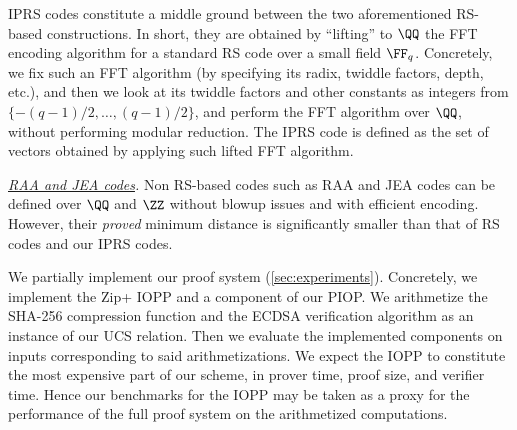 IPRS codes constitute a middle ground between the two aforementioned RS-based constructions. In short, they are obtained by ``lifting'' to $\QQ$ the FFT encoding algorithm for a standard RS code over a small field $\FF_q$. Concretely, we fix such an FFT algorithm (by specifying its radix, twiddle factors, depth, etc.), and then we look at its twiddle factors and other constants as integers from $\{-(q-1)/2, \ldots, (q-1)/2\}$, and perform the FFT algorithm over $\QQ$, without performing modular reduction. The IPRS code is defined as the set of vectors obtained by applying such lifted FFT algorithm.%


\medskip
\noindent\emph{\underline{RAA and JEA codes}.}
Non RS-based codes such as RAA and JEA codes \cite{jea_codes,blaze} can be defined over $\QQ$ and $\ZZ$ without blowup issues and with efficient encoding. However, their \emph{proved} minimum distance is significantly smaller than that of RS codes and our IPRS codes.



 



We partially implement our proof system (\cref{sec:experiments}). Concretely, we implement the Zip+ IOPP and a component of our PIOP.  We arithmetize  the SHA-256 compression function and the ECDSA verification algorithm as an instance of our UCS relation. Then we evaluate the implemented components on inputs corresponding to said arithmetizations. We expect the IOPP to constitute the most expensive part of our scheme, in prover time, proof size, and verifier time. Hence our benchmarks for the IOPP may be taken as a proxy for the performance of the full proof system on the arithmetized computations. 

